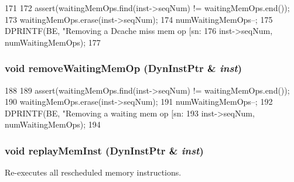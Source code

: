 \begin{DoxyCode}
171     {
172         assert(waitingMemOps.find(inst->seqNum) != waitingMemOps.end());
173         waitingMemOps.erase(inst->seqNum);
174         numWaitingMemOps--;
175         DPRINTF(BE, "Removing a Dcache miss mem op [sn:%
176                 inst->seqNum, numWaitingMemOps);
177     }
\end{DoxyCode}
\hypertarget{classLWBackEnd_a38f3385718380c23fe08a81063cc37e1}{
\subsubsection[{removeWaitingMemOp}]{\setlength{\rightskip}{0pt plus 5cm}void removeWaitingMemOp ({\bf DynInstPtr} \& {\em inst})}}
\label{classLWBackEnd_a38f3385718380c23fe08a81063cc37e1}



\begin{DoxyCode}
188     {
189         assert(waitingMemOps.find(inst->seqNum) != waitingMemOps.end());
190         waitingMemOps.erase(inst->seqNum);
191         numWaitingMemOps--;
192         DPRINTF(BE, "Removing a waiting mem op [sn:%
193                 inst->seqNum, numWaitingMemOps);
194     }
\end{DoxyCode}
\hypertarget{classLWBackEnd_ae165df775b4de9e9430228c7f04c2bc9}{
\subsubsection[{replayMemInst}]{\setlength{\rightskip}{0pt plus 5cm}void replayMemInst ({\bf DynInstPtr} \& {\em inst})}}
\label{classLWBackEnd_ae165df775b4de9e9430228c7f04c2bc9}
Re-\/executes all rescheduled memory instructions. 


